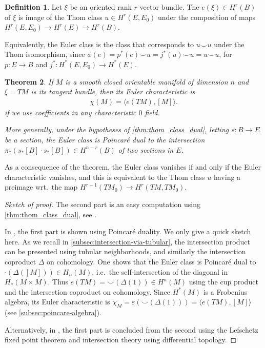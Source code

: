 \documentclass{scrartcl}
\let\emph\relax
\newcommand{\emphi}[1]{\index{#1}\emph{#1}}
\theoremstyle{plain}
\newtheorem{theorem}{Theorem}[section]
\theoremstyle{definition}
\newtheorem{definition}[theorem]{Definition}
\renewcommand{\epsilon}{\varepsilon}
\newcommand{\cupp}{\mathbin{\smile}}
\begin{document}
\begin{definition}\label{def:euler_class}
    Let $\xi$ be an oriented rank $r$ vector bundle. The \emphi{Euler class} $e(\xi)\in H^r(B)$ of $\xi$ is image of the Thom class $u\in H^r(E, E_0)$ under the composition of maps $H^r(E, E_0)\to H^r(E)\to H^r(B)$.
\end{definition}
Equivalently, the Euler class is the class that corresponds to $u\cupp u$ under the Thom isomorphism, since $\phi(e) = p^*(e) \cupp u = j^*(u)\cupp u = u\cupp u$, for $p\colon E\to B$ and $j^*\colon H^*(E, E_0) \to H^*(E)$. 
\begin{theorem}\label{thm:euler_class}
    If $M$ is a smooth closed orientable manifold of dimension $n$ and $\xi=TM$ is its tangent bundle, then its Euler characteristic is 
    \begin{align*}
        \chi(M) = \langle e(TM), [M]\rangle.
    \end{align*}
    if we use coefficients in any characteristic $0$ field.

    More generally, under the hypotheses of \ref{thm:thom_class_dual}, letting $s\colon B\to E$ be a section, the Euler class is Poincaré dual to the intersection $\pi_*(s_*[B]\cdot s_*[B])\in H^{n-r}(B)$ of two sections in $E$.
\end{theorem}
As a consequence of the theorem, the Euler class vanishes if and only if the Euler characteristic vanishes, and this is equivalent to the Thom class $u$ having a preimage wrt.\ the map $H^{r-1}(TM_0) \to H^r(TM, TM_0)$.
\begin{proof}[Sketch of proof]
The second part is an easy computation using \cref{thm:thom_class_dual}, see \cite[Thm 5.2]{hutchings2011cup}. 

In \cite{milnor1974characteristic}, the first part is shown using Poincaré duality. We only give a quick sketch here. As we recall in \cref{subsec:intersection-via-tubular}, the intersection product can be presented using tubular neighborhoods, and similarly the intersection coproduct $\Delta$ on cohomology. One shows that the Euler class is Poincaré dual to $\cdot(\Delta([M]))\in H_n(M)$, i.e.\ the self-intersection of the diagonal in $H_*(M\times M)$. Thus $e(TM) = \cupp(\Delta(1))\in H^n(M)$ using the cup product and the intersection coproduct on cohomology. Since $H^*(M)$ is a Frobenius algebra, its Euler characteristic is $\chi_M = \epsilon(\cupp(\Delta(1))) = \langle e(TM), [M]\rangle$ (see \cref{subsec:poincare-algebra}).

Alternatively, in \cite{hutchings2011cup}, the first part is concluded from the second using the Lefschetz fixed point theorem and intersection theory using differential topology.
\end{proof}
\end{document}
